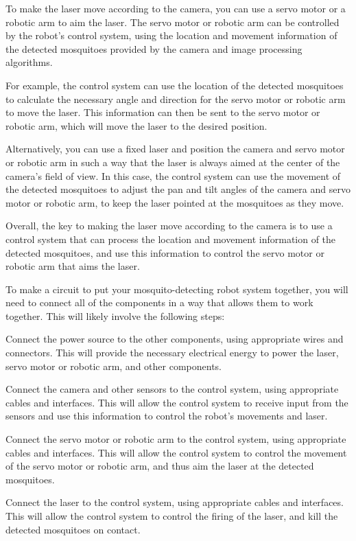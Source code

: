 \documentclass[11pt]{article}
\begin{document}
	
	To make the laser move according to the camera, you can use a servo motor or a robotic arm to aim the laser. The servo motor or robotic arm can be controlled by the robot's control system, using the location and movement information of the detected mosquitoes provided by the camera and image processing algorithms.
	
	For example, the control system can use the location of the detected mosquitoes to calculate the necessary angle and direction for the servo motor or robotic arm to move the laser. This information can then be sent to the servo motor or robotic arm, which will move the laser to the desired position.
	
	Alternatively, you can use a fixed laser and position the camera and servo motor or robotic arm in such a way that the laser is always aimed at the center of the camera's field of view. In this case, the control system can use the movement of the detected mosquitoes to adjust the pan and tilt angles of the camera and servo motor or robotic arm, to keep the laser pointed at the mosquitoes as they move.
	
	Overall, the key to making the laser move according to the camera is to use a control system that can process the location and movement information of the detected mosquitoes, and use this information to control the servo motor or robotic arm that aims the laser.
	
	
	
	To make a circuit to put your mosquito-detecting robot system together, you will need to connect all of the components in a way that allows them to work together. This will likely involve the following steps:
	
	Connect the power source to the other components, using appropriate wires and connectors. This will provide the necessary electrical energy to power the laser, servo motor or robotic arm, and other components.
	
	Connect the camera and other sensors to the control system, using appropriate cables and interfaces. This will allow the control system to receive input from the sensors and use this information to control the robot's movements and laser.
	
	Connect the servo motor or robotic arm to the control system, using appropriate cables and interfaces. This will allow the control system to control the movement of the servo motor or robotic arm, and thus aim the laser at the detected mosquitoes.
	
	Connect the laser to the control system, using appropriate cables and interfaces. This will allow the control system to control the firing of the laser, and kill the detected mosquitoes on contact.
	
\end{document}
